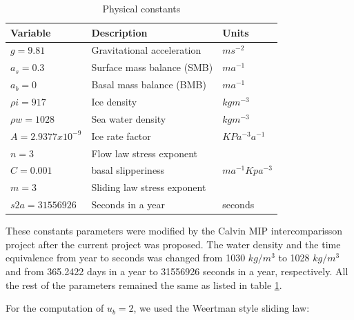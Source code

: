 \documentclass{article}
\begin{document}
\begin{table}[!h]
	\begin{center}
		\caption{Physical constants}
		\label{Physical constants}
		\begin{tabular}{|l|l|l|}
			\hline
			Variable          & Description                 & Units           \\ \hline
			$g=9.81$         & Gravitational acceleration  & $ms^{-2}$         \\ \hline
			$a_s=0.3$       & Surface mass balance (SMB)  & $ma^{-1}$         \\ \hline
			$a_b=0$             & Basal mass balance (BMB)    & $ma^{-1}$         \\ \hline
			$\rho i=917$        & Ice density                 & $kg m^{-3}$       \\ \hline
			$\rho w=1028$      & Sea water density           & $kg m^{-3}$       \\ \hline
			$A= 2.9377x10^{-9}$ & Ice rate factor             & $KPa^{-3}a^{-1}$  \\ \hline
			$n=3$               & Flow law stress exponent    &                 \\ \hline
			$C=0.001$           & basal slipperiness          & $ma^{-1}Kpa^{-3}$ \\ \hline
			$m=3$               & Sliding law stress exponent &                 \\ \hline
			$s2a=31556926$     & Seconds in a year           & seconds         \\ \hline
		\end{tabular}
	\end{center}
\end{table}

These constants parameters were modified by the Calvin MIP intercomparisson project after the current project was proposed. The water density and the time equivalence from year to seconds was changed from 1030 $kg/m^3$ to 1028 $kg/m^3$ and from 365.2422 days in a year to 31556926 seconds in a year, respectively. All the rest of the parameters remained the same as listed in table \ref{Physical constants}.

For the computation of $u_b=2$, we used the Weertman style sliding law:
\end{document}
